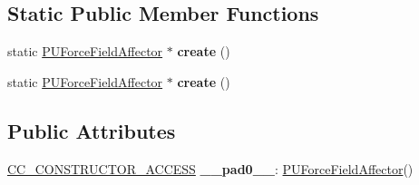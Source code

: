 \subsection*{Static Public Member Functions}
\begin{DoxyCompactItemize}
\item 
\mbox{\label{classPUForceFieldAffector_a68d3354105dd2501109da1b28da509f3}} 
static \hyperlink{classPUForceFieldAffector}{P\+U\+Force\+Field\+Affector} $\ast$ {\bfseries create} ()
\item 
\mbox{\label{classPUForceFieldAffector_a539765249dbad77f1851a459b918672c}} 
static \hyperlink{classPUForceFieldAffector}{P\+U\+Force\+Field\+Affector} $\ast$ {\bfseries create} ()
\end{DoxyCompactItemize}
\subsection*{Public Attributes}
\begin{DoxyCompactItemize}
\item 
\mbox{\label{classPUForceFieldAffector_aae1e196a1d900e5a14ff215c8ab315ef}} 
\hyperlink{_2cocos2d_2cocos_2base_2ccConfig_8h_a25ef1314f97c35a2ed3d029b0ead6da0}{C\+C\+\_\+\+C\+O\+N\+S\+T\+R\+U\+C\+T\+O\+R\+\_\+\+A\+C\+C\+E\+SS} {\bfseries \+\_\+\+\_\+pad0\+\_\+\+\_\+}\+: \hyperlink{classPUForceFieldAffector}{P\+U\+Force\+Field\+Affector}()
\end{DoxyCompactItemize}
